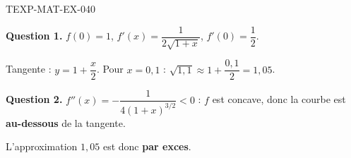 \begin{corrige}{TEXP-MAT-EX-040}

\textbf{Question 1.} $f(0)=1$, $f'(x) = \dfrac{1}{2\sqrt{1+x}}$, $f'(0) = \dfrac{1}{2}$.


Tangente : $y = 1 + \dfrac{x}{2}$. Pour $x = 0{,}1$ : $\sqrt{1{,}1} \approx 1 + \dfrac{0{,}1}{2} = 1{,}05$.

\textbf{Question 2.} $f''(x) = -\dfrac{1}{4(1+x)^{3/2}} < 0$ : $f$ est concave, donc la courbe est \textbf{au-dessous} de la tangente.

L'approximation $1{,}05$ est donc \textbf{par exces}.

\end{corrige}
